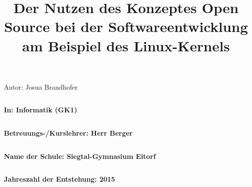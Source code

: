 \documentclass[a4paper,12pt]{article}
\title{Der Nutzen des Konzeptes Open Source bei der Softwareentwicklung am Beispiel des Linux-Kernels}
\date{}
\begin{document}
\maketitle
\thispagestyle{empty}
\begin{center}
  \LARGE Autor:    Josua Brandhofer
\end{center}
\begin{verbatim}
\end{verbatim}
\begin{center}
  \large\textbf{In:   Informatik (GK1)}
\end{center}
\begin{verbatim}
\end{verbatim}
\begin{center}
  \large\textbf{Betreuungs-/Kurslehrer:    Herr Berger}
\end{center}
\begin{verbatim}
\end{verbatim}
\begin{center}
  \large\textbf{Name der Schule:    Siegtal-Gymnasium Eitorf}
\end{center}
\begin{verbatim}
\end{verbatim}
\begin{center}
  \large\textbf{Jahreszahl der Entstehung:    2015}
\end{center}

\newpage
{}
\tableofcontents
\newpage
\end{document}

